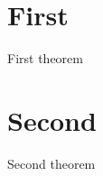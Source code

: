 \documentclass{article}
\begin{document}
\section{First}
\begin{theorem} First theorem \end{theorem}
\section{Second}
\begin{theorem} Second theorem \end{theorem}
\end{document}
